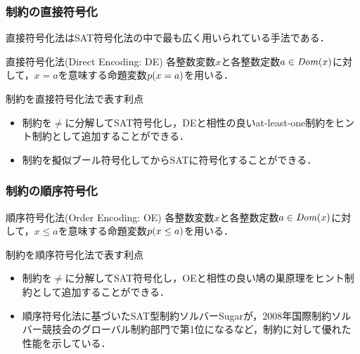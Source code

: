 \documentclass [dvipdfmx,11pt]{beamer}
\begin{document}
\begin{frame}
    \frametitle{{\alldiff}制約の直接符号化}
    直接符号化法はSAT符号化法の中で最も広く用いられている手法である．
    \begin{alertblock}{直接符号化法(Direct Encoding: DE)}
        各整数変数$x$と各整数定数$a \in {\it Dom}(x)$に対して，$x = a$を意味する命題変数\alert{\bf $p(x=a)$}を用いる．
    \end{alertblock}
    \begin{block}{{\alldiff}制約を直接符号化法で表す利点}
        \begin{itemize}
            \item {\alldiff}制約を$\neq$に分解してSAT符号化し，DEと相性の良いat-least-one制約をヒント制約として追加することができる．
            \item {\alldiff}制約を擬似ブール符号化してからSATに符号化することができる．
        \end{itemize}
    \end{block}
\end{frame}



\begin{frame}
    \frametitle{{\alldiff}制約の順序符号化}
    \begin{alertblock}{順序符号化法(Order Encoding: OE)}
        各整数変数$x$と各整数定数$a \in {\it Dom}(x)$に対して，$x \le a$を意味する命題変数\alert{\bf $p(x\le a)$}を用いる．
    \end{alertblock}
    \begin{block}{{\alldiff}制約を順序符号化法で表す利点}
        \begin{itemize}
            \item {\alldiff}制約を$\neq$に分解してSAT符号化し，OEと相性の良い鳩の巣原理をヒント制約として追加することができる．
        \end{itemize}
    \end{block}
    \begin{itemize}
        \item 順序符号化法に基づいたSAT型制約ソルバーSugarが，2008年国際制約ソルバー競技会のグローバル制約部門で第1位になるなど，{\alldiff}制約に対して優れた性能を示している．
    \end{itemize}
\end{frame}
\end{document}
